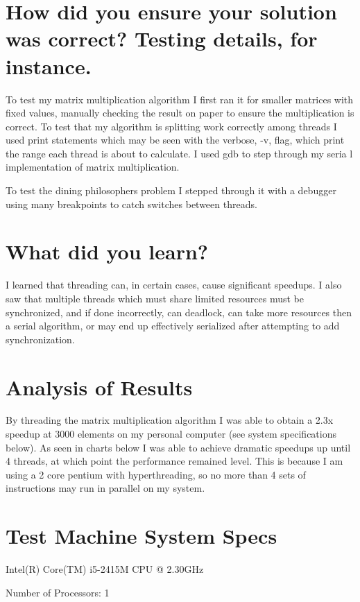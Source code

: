 \documentclass[letterpaper,10pt]{article} %
\begin{document}
\section{How did you ensure your solution was correct? Testing details, for instance.}


To test my matrix multiplication algorithm I first ran it for smaller matrices
with fixed values, manually checking the result on paper to ensure the multiplication
is correct. To test that my algorithm is splitting work correctly among threads I
used print statements which may be seen with the verbose, -v, flag, which print
the range each thread is about to calculate. I used gdb to step through my seria
l implementation of matrix multiplication.


To test the dining philosophers problem I stepped through it with a debugger
using many breakpoints to catch switches between threads.


\section{What did you learn?}


I learned that threading can, in certain cases, cause significant speedups.
I also saw that multiple threads which must share limited resources must be 
synchronized, and if done incorrectly, can deadlock, can take more resources
then a serial algorithm, or may end up effectively serialized after
attempting to add synchronization. 

\section{Analysis of Results}


	By threading the matrix multiplication algorithm I was able to obtain a
	2.3x speedup at 3000 elements on my personal computer (see system specifications below).
	As seen in charts below I was able to achieve dramatic speedups up until 4
	threads, at which point the performance remained level. This is because I
	am using a 2 core pentium with hyperthreading, so no more than 4 sets of 
	instructions may run in parallel on my system.


\section{Test Machine System Specs}

Intel(R) Core(TM) i5-2415M CPU @ 2.30GHz 

Number of Processors: 1
\end{document}
